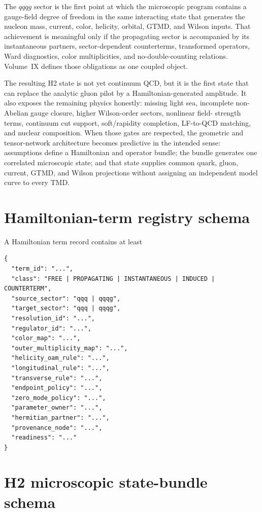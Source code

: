 \documentclass[11pt]{article}
\begin{document}
The \(qqqg\) sector is the first point at which the microscopic program contains
a gauge-field degree of freedom in the same interacting state that generates
the nucleon mass, current, color, helicity, orbital, GTMD, and Wilson inputs.
That achievement is meaningful only if the propagating sector is accompanied
by its instantaneous partners, sector-dependent counterterms, transformed
operators, Ward diagnostics, color multiplicities, and no-double-counting
relations.  Volume~IX defines those obligations as one coupled object.

The resulting H2 state is not yet continuum QCD, but it is the first state that
can replace the analytic gluon pilot by a Hamiltonian-generated amplitude.  It
also exposes the remaining physics honestly: missing light sea, incomplete
non-Abelian gauge closure, higher Wilson-order sectors, nonlinear field-
strength terms, continuum cut support, soft/rapidity completion, LF-to-QCD
matching, and nuclear composition.  When those gates are respected, the
geometric and tensor-network architecture becomes predictive in the intended
sense: assumptions define a Hamiltonian and operator bundle; the bundle
generates one correlated microscopic state; and that state supplies common
quark, gluon, current, GTMD, and Wilson projections without assigning an
independent model curve to every TMD.

\appendix

\section{Hamiltonian-term registry schema}

A Hamiltonian term record contains at least
\begin{verbatim}
{
  "term_id": "...",
  "class": "FREE | PROPAGATING | INSTANTANEOUS | INDUCED | COUNTERTERM",
  "source_sector": "qqq | qqqg",
  "target_sector": "qqq | qqqg",
  "resolution_id": "...",
  "regulator_id": "...",
  "color_map": "...",
  "outer_multiplicity_map": "...",
  "helicity_oam_rule": "...",
  "longitudinal_rule": "...",
  "transverse_rule": "...",
  "endpoint_policy": "...",
  "zero_mode_policy": "...",
  "parameter_owner": "...",
  "hermitian_partner": "...",
  "provenance_node": "...",
  "readiness": "..."
}
\end{verbatim}

\section{H2 microscopic state-bundle schema}
\end{document}

